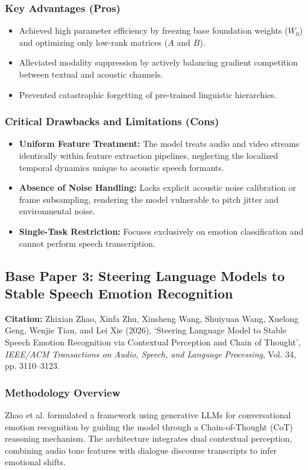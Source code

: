 \subsubsection{Key Advantages (Pros)}
\begin{itemize}
    \item Achieved high parameter efficiency by freezing base foundation weights ($W_0$) and optimizing only low-rank matrices ($A$ and $B$).
    \item Alleviated modality suppression by actively balancing gradient competition between textual and acoustic channels.
    \item Prevented catastrophic forgetting of pre-trained linguistic hierarchies.
\end{itemize}

\subsubsection{Critical Drawbacks and Limitations (Cons)}
\begin{itemize}
    \item \textbf{Uniform Feature Treatment:} The model treats audio and video streams identically within feature extraction pipelines, neglecting the localized temporal dynamics unique to acoustic speech formants.
    \item \textbf{Absence of Noise Handling:} Lacks explicit acoustic noise calibration or frame subsampling, rendering the model vulnerable to pitch jitter and environmental noise.
    \item \textbf{Single-Task Restriction:} Focuses exclusively on emotion classification and cannot perform speech transcription.
\end{itemize}

\subsection{Base Paper 3: Steering Language Models to Stable Speech Emotion Recognition}
\textbf{Citation:} Zhixian Zhao, Xinfa Zhu, Xinsheng Wang, Shuiyuan Wang, Xuelong Geng, Wenjie Tian, and Lei Xie (2026), `Steering Language Model to Stable Speech Emotion Recognition via Contextual Perception and Chain of Thought', \textit{IEEE/ACM Transactions on Audio, Speech, and Language Processing}, Vol. 34, pp. 3110--3123.

\subsubsection{Methodology Overview}
Zhao et al. formulated a framework using generative LLMs for conversational emotion recognition by guiding the model through a Chain-of-Thought (CoT) reasoning mechanism. The architecture integrates dual contextual perception, combining audio tone features with dialogue discourse transcripts to infer emotional shifts.

